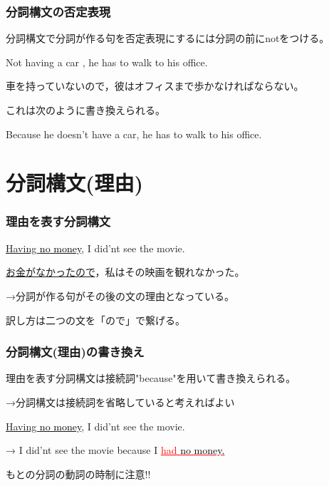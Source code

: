 \documentclass[xcolor=dvipsnames,unicode,14pt]{beamer}%
\begin{document}
\begin{frame}
  \frametitle{分詞構文の否定表現}

  分詞構文で分詞が作る句を否定表現にするには分詞の前にnotをつける。

  \textcolor{NavyBlue}{Not having a car} , he has to walk to his office.

  \textcolor{NavyBlue}{車を持っていないので}，彼はオフィスまで歩かなければならない。

  これは次のように書き換えられる。

  \textcolor{NavyBlue}{Because he doesn't have a car}, he has to walk to his office.

\end{frame}



\section{分詞構文(理由)}
\begin{frame}
  \frametitle{理由を表す分詞構文}

  \textcolor{NavyBlue}{\underline{Having \textcolor{black}{no money}}}, I did'nt see the movie.

  \underline{お金がなかったので}，私はその映画を観れなかった。

  →分詞が作る句がその後の文の理由となっている。

  訳し方は二つの文を「ので」で繋げる。
\end{frame}

\begin{frame}
  \frametitle{分詞構文(理由)の書き換え}

  理由を表す分詞構文は接続詞"because"を用いて書き換えられる。

  →分詞構文は接続詞を省略していると考えればよい

  \textcolor{NavyBlue}{\underline{Having \textcolor{black}{no money}}}, I did'nt see the movie.

  → I did'nt see the movie \textcolor{NavyBlue}{because}
   I \textcolor{Red}{\underline{had \textcolor{black}{no money.}}}

  もとの分詞の動詞の時制に注意!!

\end{frame}
\end{document}
